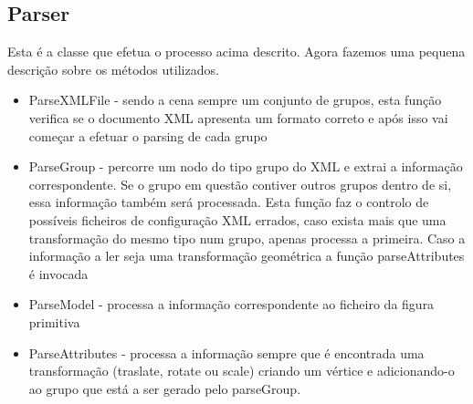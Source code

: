 \documentclass[12pt]{article}
\begin{document}
\subsection{Parser}
Esta é a classe que efetua o processo acima descrito. Agora fazemos uma pequena descrição sobre os métodos utilizados.
\begin{itemize}
\item ParseXMLFile - sendo a cena sempre um conjunto de grupos, esta função verifica se o documento XML apresenta um formato
correto e após isso vai começar a efetuar o parsing de cada grupo
\item ParseGroup - percorre um nodo do tipo grupo do XML e extrai a informação correspondente. Se o grupo em questão
contiver outros grupos dentro de si, essa informação também será processada. Esta função faz o controlo de possíveis ficheiros
de configuração XML errados, caso exista mais que uma transformação do mesmo tipo num grupo, apenas processa a primeira.
Caso a informação a ler seja uma transformação geométrica a função parseAttributes é invocada
\item ParseModel - processa a informação correspondente ao ficheiro da figura primitiva
\item ParseAttributes - processa a informação sempre que é encontrada uma transformação (traslate, rotate ou scale) criando
um vértice e adicionando-o ao grupo que está a ser gerado pelo
parseGroup.
\end{itemize}
\newpage
\end{document}
